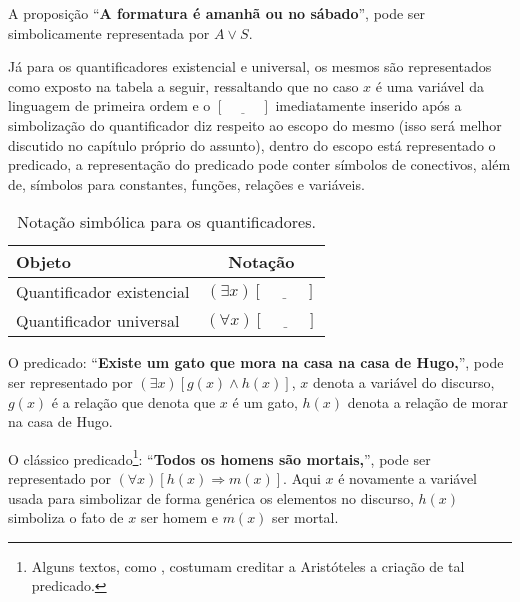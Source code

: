 \begin{exemplo}\label{exe:RepresentacaoSimbolica2}
	A proposição ``\textbf{A formatura é amanhã ou no sábado}'', pode ser simbolicamente representada por $A \lor S$.
\end{exemplo}

Já para os quantificadores existencial e universal, os mesmos são representados como exposto na tabela a seguir, ressaltando que no caso $x$ é uma variável da linguagem de primeira ordem e o $[\underline{ \ \ \ \ \ \ \ \ \ \ \ \ }]$ imediatamente inserido após a simbolização do quantificador diz respeito ao escopo do mesmo (isso será melhor discutido no capítulo próprio do assunto), dentro do escopo está representado o predicado, a representação do predicado pode conter símbolos de conectivos, além de, símbolos para constantes, funções, relações e variáveis.

\begin{table}[h]
	\centering
	\begin{tabular}{lc}
		\hline
		\textbf{Objeto} & \textbf{Notação}\\
		\hline
		Quantificador existencial & $(\exists x)[\underline{ \ \ \ \ \ \ \ \ \ \ \ \ }]$\\
		Quantificador universal & $(\forall x)[\underline{ \ \ \ \ \ \ \ \ \ \ \ \ }]$\\
		\hline
	\end{tabular}
	\caption{Notação simbólica para os quantificadores.}
\end{table}

\begin{exemplo}\label{exe:RepresentacaoSimbolica3}
	O predicado: ``\textbf{Existe um gato que mora na casa na casa de Hugo,}'', pode ser representado por $(\exists x)[g(x) \land h(x)]$, $x$ denota a variável do discurso, $g(x)$ é a relação que denota que $x$ é um gato, $h(x)$ denota a relação de morar na casa de Hugo.
\end{exemplo}

\begin{exemplo}\label{exe:RepresentacaoSimbolica4}
	O clássico predicado\footnote{Alguns textos, como \cite{carmo2013}, costumam creditar a Aristóteles a criação de tal predicado.}: ``\textbf{Todos os homens são mortais,}'', pode ser representado por $(\forall x)[h(x) \Rightarrow m(x)]$. Aqui $x$ é novamente a variável usada para simbolizar de forma genérica os elementos no discurso, $h(x)$ simboliza o fato de $x$ ser homem e $m(x)$ ser mortal.
\end{exemplo}

